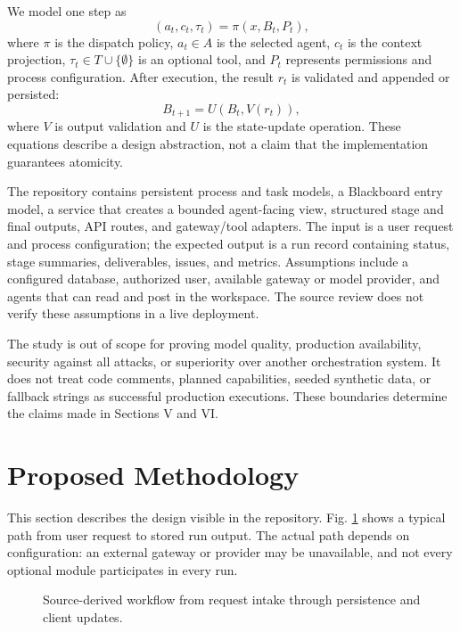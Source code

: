 \documentclass[12pt,onecolumn,draftclsnofoot]{IEEEtran}
\begin{document}
We model one step as
\begin{equation}
(a_t, c_t, \tau_t) = \pi(x, B_t, P_t), \label{eq:dispatch}
\end{equation}
where $\pi$ is the dispatch policy, $a_t \in A$ is the selected agent, $c_t$ is the context projection, $\tau_t \in T \cup \{\emptyset\}$ is an optional tool, and $P_t$ represents permissions and process configuration. After execution, the result $r_t$ is validated and appended or persisted:
\begin{equation}
B_{t+1} = U(B_t, V(r_t)), \label{eq:update}
\end{equation}
where $V$ is output validation and $U$ is the state-update operation. These equations describe a design abstraction, not a claim that the implementation guarantees atomicity.

The repository contains persistent process and task models, a Blackboard entry model, a service that creates a bounded agent-facing view, structured stage and final outputs, API routes, and gateway/tool adapters. The input is a user request and process configuration; the expected output is a run record containing status, stage summaries, deliverables, issues, and metrics. Assumptions include a configured database, authorized user, available gateway or model provider, and agents that can read and post in the workspace. The source review does not verify these assumptions in a live deployment.

The study is out of scope for proving model quality, production availability, security against all attacks, or superiority over another orchestration system. It does not treat code comments, planned capabilities, seeded synthetic data, or fallback strings as successful production executions. These boundaries determine the claims made in Sections V and VI.

\section{Proposed Methodology}
This section describes the design visible in the repository. Fig. \ref{fig:workflow} shows a typical path from user request to stored run output. The actual path depends on configuration: an external gateway or provider may be unavailable, and not every optional module participates in every run.

\begin{figure}[t]
\centering
{}
\caption{Source-derived workflow from request intake through persistence and client updates.}
\label{fig:workflow}
\end{figure}
\end{document}
